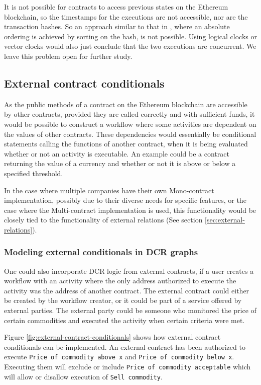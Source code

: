 \documentclass{article}
\begin{document}
			It is not possible for contracts to access previous states on the Ethereum blockchain, so the timestamps for the executions are not accessible, nor are the transaction hashes. 
			So an approach similar to that in \cite{bachelor}, where an absolute ordering is achieved by sorting on the hash, is not possible.
			Using logical clocks or vector clocks would also just conclude that the two executions are concurrent.
			We leave this problem open for further study.

		\subsection{External contract conditionals}
		As the public methods of a contract on the Ethereum blockchain are accessible by other contracts, provided they are called correctly and with sufficient funds, it would be possible to construct a workflow where some activities are dependent on the values of other contracts.
		These dependencies would essentially be conditional statements calling the functions of another contract, when it is being evaluated whether or not an activity is executable. 
		An example could be a contract returning the value of a currency and whether or not it is above or below a specified threshold.

		In the case where multiple companies have their own Mono-contract implementation, possibly due to their diverse needs for specific features, or the case where the Multi-contract implementation is used, this functionality would be closely tied to the functionality of external relations (See section \ref{sec:external-relations}).

			\subsubsection{Modeling external conditionals in DCR graphs}
			One could also incorporate DCR logic from external contracts, if a user creates a workflow with an activity where the only address authorized to execute the activity was the address of another contract.
			The external contract could either be created by the workflow creator, or it could be part of a service offered by external parties.
			The external party could be someone who monitored the price of certain commodities and executed the activity when certain criteria were met.
			
			Figure \ref{fig:external-contract-conditionals} shows how external contract conditionals can be implemented. 
			An external contract has been authorized to execute \texttt{Price of commodity above x} and \texttt{Price of commodity below x}. 
			Executing them will exclude or include \texttt{Price of commodity acceptable} which will allow or disallow execution of \texttt{Sell commodity}.
			
\end{document}

